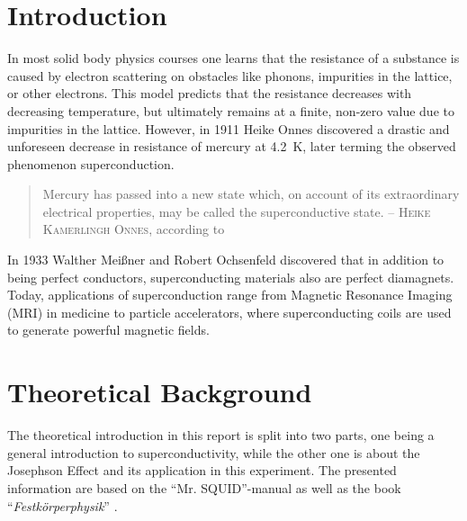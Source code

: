 \documentclass[a4paper,10pt]{article}
\begin{document}
\section{Introduction}
In most solid body physics courses one learns that the resistance of a substance is caused by electron scattering on obstacles like phonons, impurities in the lattice, or other electrons.\cite{grossmarx} This model predicts that the resistance decreases with decreasing temperature, but ultimately remains at a finite, non-zero value due to impurities in the lattice. 
However, in 1911 Heike Onnes discovered a drastic and unforeseen decrease in resistance of mercury at \SI{4.2}{\kelvin}, later terming the observed phenomenon superconduction. 
\begin{quote}
    Mercury has passed into a new state which, on account of its extraordinary electrical properties, may be called the superconductive state. \newline
    -- \textsc{Heike Kamerlingh Onnes}, according to \cite{grossmarx}
\end{quote} 
In 1933 Walther Meißner and Robert Ochsenfeld discovered that in addition to being perfect conductors, superconducting materials also are perfect diamagnets. Today, applications of superconduction range from Magnetic Resonance Imaging (MRI) in medicine to particle accelerators, where superconducting coils are used to generate powerful magnetic fields.\cite{grossmarx}

\section{Theoretical Background}

The theoretical introduction in this report is split into two parts, one being a general introduction to superconductivity, while the other one is about the Josephson Effect and its application in this experiment. The presented information are based on the ``Mr. SQUID''-manual \cite{skriptum} as well as the book ``\textit{Festkörperphysik}'' \cite{grossmarx}.
\end{document}
